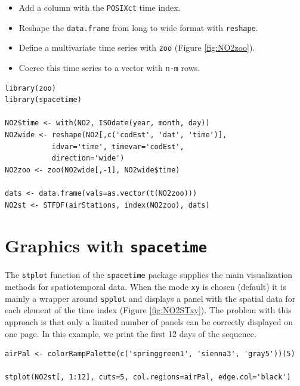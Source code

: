 \begin{itemize}
\item Add a column with the \texttt{POSIXct} time index.
\item Reshape the \texttt{data.frame} from long to wide format with
  \texttt{reshape}.
\item Define a multivariate time series with \texttt{zoo} (Figure
  \ref{fig:NO2zoo}).
\item Coerce this time series to a vector with \texttt{n·m} rows.
\end{itemize}


\lstset{language=R,numbers=none}
\begin{lstlisting}
library(zoo)
library(spacetime)

NO2$time <- with(NO2, ISOdate(year, month, day))
NO2wide <- reshape(NO2[,c('codEst', 'dat', 'time')],
		   idvar='time', timevar='codEst',
		   direction='wide')
NO2zoo <- zoo(NO2wide[,-1], NO2wide$time)

dats <- data.frame(vals=as.vector(t(NO2zoo)))
NO2st <- STFDF(airStations, index(NO2zoo), dats)
\end{lstlisting}
\section{Graphics with \texttt{spacetime}}
\label{sec-3}
The \texttt{stplot} function of the \texttt{spacetime} package supplies the main
visualization methods for spatiotemporal data. When the mode \texttt{xy} is
chosen (default) it is mainly a wrapper around \texttt{spplot} and displays a
panel with the spatial data for each element of the time index (Figure
\ref{fig:NO2STxy}). The problem with this approach is that only a limited
number of panels can be correctly displayed on one page. In this
example, we print the first 12 days of the sequence.


\lstset{language=R,numbers=none}
\begin{lstlisting}
airPal <- colorRampPalette(c('springgreen1', 'sienna3', 'gray5'))(5)

stplot(NO2st[, 1:12], cuts=5, col.regions=airPal, edge.col='black')
\end{lstlisting}

